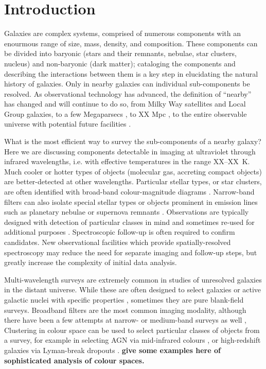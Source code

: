 \section{Introduction}

Galaxies are complex systems, comprised of numerous components with an enourmous range of size,
mass, density, and composition.
These components can be divided into baryonic (stars and their remnants,
nebulae, star clusters, nucleus) and non-baryonic (dark matter);
cataloging the components and describing
the interactions between them is a key step in elucidating the natural history of galaxies.
Only in nearby galaxies can individual sub-components be resolved.
As observational technology has advanced,
the definition of ``nearby'' has changed and will continue to do so, from Milky Way satellites and Local Group galaxies, to a few
Megaparsecs \citep[distance at which stars can be resolved with HST][]{},
to XX Mpc \citep[distance at which stars can be resolved with JWST][]{},
to the entire observable universe with potential future facilities \citep{}.

What is the most efficient way to survey the sub-components of a nearby galaxy?
Here we are discussing components detectable in imaging at ultraviolet through infrared wavelengths,
i.e. with effective temperatures in the range XX--XX~K.
Much cooler or hotter types of objects (molecular gas, accreting compact objects) are better-detected at other wavelengths.
Particular stellar types, or star clusters, are often identified with broad-band colour-magnitude diagrams \citep[e.g.][]{}.
Narrow-band filters can also isolate special stellar types \citep[e.g.][]{} or objects prominent in emission
lines such as planetary nebulae or supernova remnants \citep[e.g.][]{}.
Observations are typically designed with detection of particular classes in mind and sometimes re-used for additional purposes \citep[e.g.][]{}.
Spectroscopic follow-up is often required to confirm candidates.
New observational facilities which provide spatially-resolved spectroscopy  \citep[e.g.]{}{} may reduce the need for separate imaging and follow-up steps,
but greatly increase the complexity of initial data analysis.


Multi-wavelength surveys are extremely common in studies of unresolved galaxies in the distant universe.
While these are often designed to select galaxies or active galactic nuclei with specific properties \citep[e.g.][]{},
sometimes they are pure blank-field surveys.
Broadband 
filters are the most common imaging modality,
although there have been a few attempts at narrow- or medium-band surveys as well \citep[e.g.][]{combo-17},
Clustering in colour space can be used to select particular classes of objects from a survey,
for example in selecting AGN via mid-infrared colours \citep[e.g.][]{},
or high-redshift galaxies via Lyman-break dropouts \citep[e.g.][]{}. 
{\bf give some examples here of sophisticated analysis of colour spaces.}

